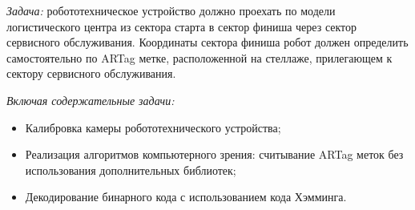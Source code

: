 
\textit{Задача:} робототехническое устройство должно проехать по модели логистического
центра из сектора старта в сектор финиша через сектор сервисного обслуживания.
Координаты сектора финиша робот должен определить самостоятельно по ARTag метке,
расположенной на стеллаже, прилегающем к сектору сервисного обслуживания.

\textit{Включая содержательные задачи:}
\begin{itemize}
    \item Калибровка камеры робототехнического устройства;
    \item Реализация алгоритмов компьютерного зрения: считывание ARTag меток без
    использования дополнительных библиотек;
    \item Декодирование бинарного кода с использованием кода Хэмминга.
\end{itemize}